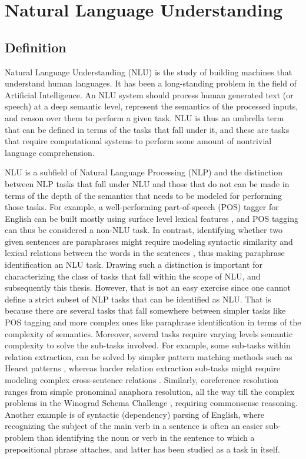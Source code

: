 \section{Natural Language Understanding}
\subsection{Definition}
Natural Language Understanding (NLU) is the study of building machines that understand human languages.
It has been a long-standing
problem in the field of Artificial Intelligence. An NLU system should process human generated text
(or speech) at a deep semantic level, represent the semantics of the processed inputs, and reason
over them to perform a given task. NLU is thus an umbrella term that can be defined in terms of the
tasks that fall under it, and these are tasks that require computational systems to perform some
amount of nontrivial language comprehension.

NLU is a subfield of Natural Language Processing (NLP) and the distinction between NLP tasks that
fall under NLU and those that do not can be made in terms of the depth of the semantics that needs
to be modeled for performing those tasks.  For example, a well-performing part-of-speech (POS)
tagger for English can be built mostly using surface level lexical features
\citep{toutanova2003feature}, and POS tagging can thus be considered a non-NLU task. In contrast,
identifying whether two given sentences are paraphrases might require modeling syntactic similarity
and lexical relations between the words in the sentences \citep{das2009paraphrase}, thus making
paraphrase identification an NLU task. Drawing such a distinction is important for characterizing the class of tasks
that fall within the scope of NLU, and subsequently this thesis. However, that is not an easy exercise since
one cannot define a strict subset of NLP tasks that
can be identified as NLU\@. That is because there are several tasks that fall somewhere between
simpler tasks like POS tagging and more complex ones like paraphrase identification in terms of the
complexity of semantics.  Moreover, several tasks require varying levels semantic complexity to
solve the sub-tasks involved.
For example, some sub-tasks within relation extraction, can be solved by simpler pattern matching
methods such as Hearst patterns \citep{hearst1992automatic}, whereas harder relation extraction  
sub-tasks might require modeling complex cross-sentence relations \citep{peng2017cross}.
Similarly, coreference resolution ranges from simple pronominal anaphora resolution, all the way till
the complex problems in the Winograd Schema Challenge \citep{levesque2012winograd}, requiring
commonsense reasoning. Another example is of syntactic (dependency) parsing of English, where recognizing
the subject of the main verb in a sentence is often an easier sub-problem than identifying the noun or
verb in the sentence to which a prepositional phrase attaches, and latter has been studied as a task
in itself.

